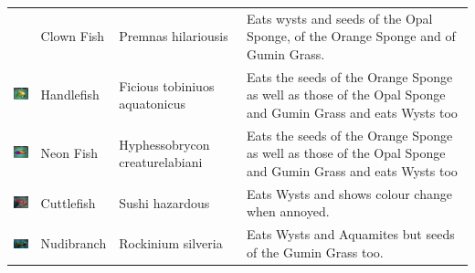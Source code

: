 \documentclass[11pt,twoside,a4paper]{article}
\begin{document}
\begin{longtable}{ p{1.60cm} p{1.95cm} p{2.55cm} p{11.00cm} }
																&	Clown Fish		&	Premnas \newline hilariousis		
																&	Eats wysts and seeds of the Opal Sponge, of the Orange Sponge and of Gumin Grass.	\\
	\begin{minipage}[ht]{1.55cm} \includegraphics[width=1.50cm]{img/angelf.jpg} \end{minipage}		
																&	Handlefish		&	Ficious \newline tobiniuos \newline aquatonicus		
																&	Eats the seeds of the Orange Sponge as well as those of the Opal Sponge and Gumin Grass and eats Wysts too	\\
	\begin{minipage}[ht]{1.55cm} \includegraphics[width=1.50cm]{img/neonf.jpg} \end{minipage}		
																&	Neon Fish		&	Hyphessobrycon creaturelabiani		
																&	Eats the seeds of the Orange Sponge as well as those of the Opal Sponge and Gumin Grass and eats Wysts too	\\
	\begin{minipage}[ht]{1.55cm} \includegraphics[width=1.50cm]{img/tintf.jpg} \end{minipage}		
																&	Cuttlefish		&	Sushi \newline hazardous		
																&	Eats Wysts and shows colour change when annoyed.	\\
	\begin{minipage}[ht]{1.55cm} \includegraphics[width=1.50cm]{img/seasnail.jpg} \end{minipage}		
																&	Nudibranch		&	Rockinium \newline silveria		
																&	Eats Wysts and Aquamites but seeds of the Gumin Grass too.	\\

\end{longtable}
\end{document}
